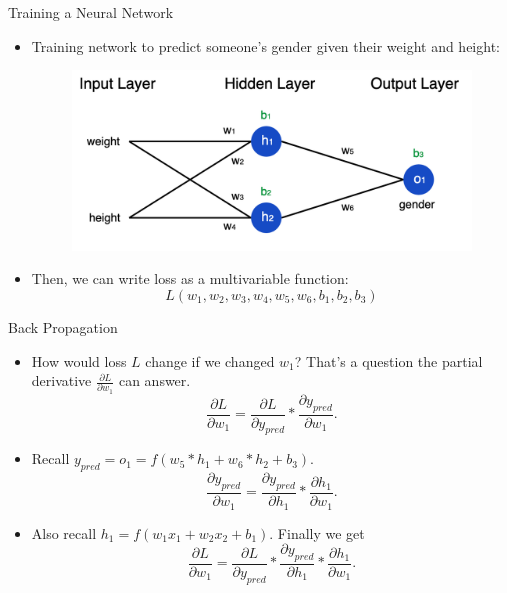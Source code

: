 \documentclass[11pt]{beamer}
\begin{document}
\begin{frame}{Training a Neural Network}
\begin{itemize}
	\item  Training network to predict someone’s gender given their weight and height:
	
	\begin{figure}
		\centering
		\includegraphics[scale=0.49]{neuralnetworktraning2}
	\end{figure}		
		\item Then, we can write loss as a multivariable function:
	$$L(w_1,w_2,w_3,w_4,w_5,w_6,b_1,b_2,b_3)$$
	
\end{itemize}
\end{frame}

\begin{frame}{Back Propagation}
\vspace{-2mm}
\begin{itemize}
	\item  How would loss $L$ change if we changed $w_1$? That's a question the partial derivative $\frac{\partial L}{\partial w_1}$ can answer. 
	\pause 
	 $$\dfrac{\partial L}{\partial w_1}= \dfrac{\partial L}{\partial y_{pred}}*\dfrac{\partial y_{pred}}{\partial w_1} .$$
	\pause 
	\item Recall $ y_{pred}=o_1=f(w_5*h_1+w_6*h_2+b_3)$.
	\pause 
	$$\dfrac{\partial y_{pred}}{\partial w_1} =\dfrac{\partial y_{pred}}{\partial h_1} *\dfrac{\partial h_1}{\partial w_1} .$$
	\item Also recall $h_1 = f(w_1x_1+w_2x_2+b_1)$. Finally we get
	\pause 
	$$\dfrac{\partial L}{\partial w_1} = \dfrac{\partial L}{\partial y_{pred}}*\dfrac{\partial y_{pred}}{\partial h_1}*\dfrac{\partial h_1}{\partial w_1}.$$
\end{itemize}
\end{frame}
\end{document}
